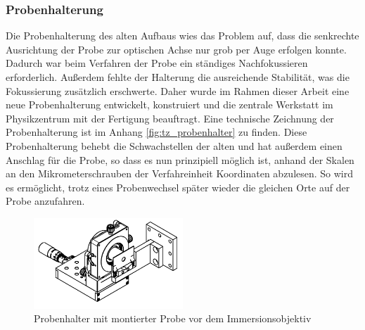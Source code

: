 \documentclass[a4paper, titlepage,  ngerman, fullpage]{book}
\begin{document}
	\subsubsection{Probenhalterung}
	Die Probenhalterung des alten Aufbaus wies das Problem auf, dass die senkrechte Ausrichtung der Probe zur optischen Achse nur grob per Auge erfolgen konnte. Dadurch war beim Verfahren der Probe ein ständiges Nachfokussieren erforderlich. Außerdem fehlte der Halterung die ausreichende Stabilität, was die Fokussierung zusätzlich erschwerte. Daher wurde im Rahmen dieser Arbeit eine neue Probenhalterung entwickelt, konstruiert und die zentrale Werkstatt im Physikzentrum mit der Fertigung beauftragt. Eine technische Zeichnung der Probenhalterung ist im Anhang \ref{fig:tz_probenhalter} zu finden. Diese Probenhalterung behebt die Schwachstellen der alten und hat außerdem einen Anschlag für die Probe, so dass es nun prinzipiell möglich ist, anhand der Skalen an den Mikrometerschrauben der Verfahreinheit Koordinaten abzulesen. So wird es ermöglicht, trotz eines Probenwechsel später wieder die gleichen Orte auf der Probe anzufahren.
	\begin{figure} 
		\centering
		\includegraphics[width=0.5\textwidth]{figures/Probenhalter.pdf}
		\caption[Probenhalterung]{Probenhalter mit montierter Probe vor dem Immersionsobjektiv}
		\label{fig:probenhalter}
	\end{figure}
\end{document}
